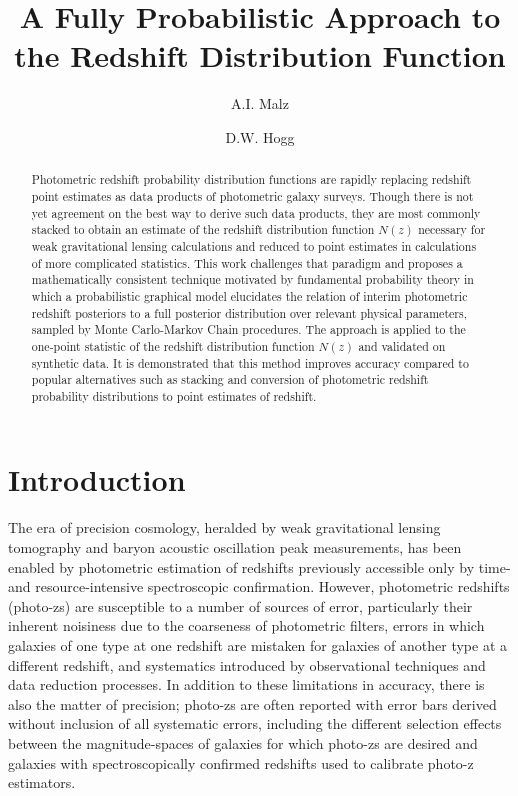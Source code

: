 \documentclass[preprint]{aastex}
\begin{document}
\title{A Fully Probabilistic Approach to the Redshift Distribution Function}

\author{A.I. Malz}

\author{D.W. Hogg}


\begin{abstract}
Photometric redshift probability distribution functions are rapidly replacing 
redshift point estimates as data products of photometric galaxy surveys.  
Though there is not yet agreement on the best way to derive such data products, 
they are most commonly stacked to obtain an estimate of the redshift 
distribution function $N(z)$ necessary for weak gravitational lensing 
calculations and reduced to point estimates in calculations of more complicated 
statistics.  This work challenges that paradigm and proposes a mathematically 
consistent technique motivated by fundamental probability theory in which a 
probabilistic graphical model elucidates the relation of interim photometric 
redshift posteriors to a full posterior distribution over relevant physical 
parameters, sampled by Monte Carlo-Markov Chain procedures.  The approach is 
applied to the one-point statistic of the redshift distribution function $N(z)$ 
and validated on synthetic data.  It is demonstrated that this method improves 
accuracy compared to popular alternatives such as stacking and conversion of 
photometric redshift probability distributions to point estimates of redshift.
\end{abstract}


\clearpage
\section{Introduction}
\label{sec:intro}

The era of precision cosmology, heralded by weak gravitational lensing 
tomography and baryon acoustic oscillation peak measurements, has been enabled 
by photometric estimation of redshifts previously accessible only by time- and 
resource-intensive spectroscopic confirmation.  However, photometric redshifts 
(photo-zs) are susceptible to a number of sources of error, particularly their 
inherent noisiness due to the coarseness of photometric filters, errors in 
which galaxies of one type at one redshift are mistaken for galaxies of another 
type at a different redshift, and systematics introduced by observational 
techniques and data reduction processes.  In addition to these limitations in 
accuracy, there is also the matter of precision; photo-zs are often reported 
with error bars derived without inclusion of all systematic errors, including 
the different selection effects between the magnitude-spaces of galaxies for 
which photo-zs are desired and galaxies with spectroscopically confirmed 
redshifts used to calibrate photo-z estimators.
\end{document}
